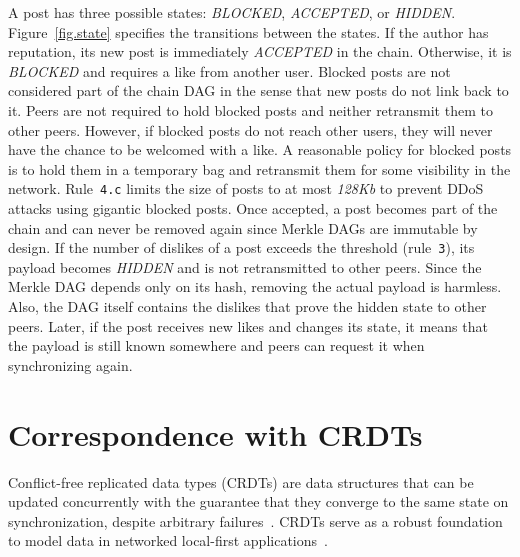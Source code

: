\documentclass[10pt,journal,compsoc]{IEEEtran}
\begin{document}
A post has three possible states: \emph{BLOCKED}, \emph{ACCEPTED}, or
\emph{HIDDEN}.
Figure~\ref{fig.state} specifies the transitions between the states.
%
If the author has reputation, its new post is immediately \emph{ACCEPTED} in
the chain.
Otherwise, it is \emph{BLOCKED} and requires a like from another user.
Blocked posts are not considered part of the chain DAG in the sense that new
posts do not link back to it.
%
Peers are not required to hold blocked posts and neither retransmit them to
other peers.
However, if blocked posts do not reach other users, they will never have the
chance to be welcomed with a like.
A reasonable policy for blocked posts is to hold them in a temporary bag and
retransmit them for some visibility in the network.
Rule~\texttt{4.c} limits the size of posts to at most \emph{128Kb} to prevent
DDoS attacks using gigantic blocked posts.
%
Once accepted, a post becomes part of the chain and can never be removed
again since Merkle DAGs are immutable by design.
%
If the number of dislikes of a post exceeds the threshold (rule~\texttt{3}),
its payload becomes \emph{HIDDEN} and is not retransmitted to other peers.
Since the Merkle DAG depends only on its hash, removing the actual payload is
harmless.
Also, the DAG itself contains the dislikes that prove the hidden state to other
peers.
Later, if the post receives new likes and changes its state, it means that the
payload is still known somewhere and peers can request it when synchronizing
again.

\section{Correspondence with CRDTs}

Conflict-free replicated data types (CRDTs) are data structures that can be
updated concurrently with the guarantee that they converge to the same state on
synchronization, despite arbitrary failures~\cite{p2p.crdts}.
%
CRDTs serve as a robust foundation to model data in networked local-first
applications~\cite{p2p.local}.
\end{document}
